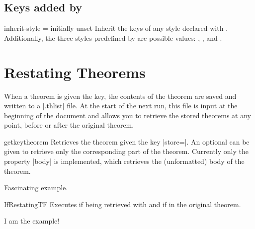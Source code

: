 \documentclass{ltxdoc}
\begin{document}
\subsection{Keys added by }

\begin{docKey}{inherit-style}
  {=}
  {initially unset}
Inherit the keys of any style declared with . Additionally, the three styles predefined by  are possible values: , , and .
\end{docKey}

\section{Restating Theorems}

When a theorem is given the  key, the contents of the theorem are saved and written to a |.thlist| file. At the start of the next run, this file is input at the beginning of the document and allows you to retrieve the stored theorems at any point, before or after the original theorem.

\begin{docCommand}{getkeytheorem}
  {}
Retrieves the theorem given the key |store=|. An optional  can be given to retrieve only the corresponding part of the theorem. Currently only the property |body| is implemented, which retrieves the (unformatted) body of the theorem.

\begin{keythmscode}[]

\begin{example}[store=mytag]
Fascinating example.
\end{example}

\end{keythmscode}

\end{docCommand}

\begin{docCommand}{IfRestatingTF}
  {}
Executes  if being retrieved with  and  if in the original theorem.

\begin{keythmscode}[]
\begin{example}[store=hmm]
I am the
example!
\end{example}

\end{keythmscode}

\end{docCommand}
\end{document}
